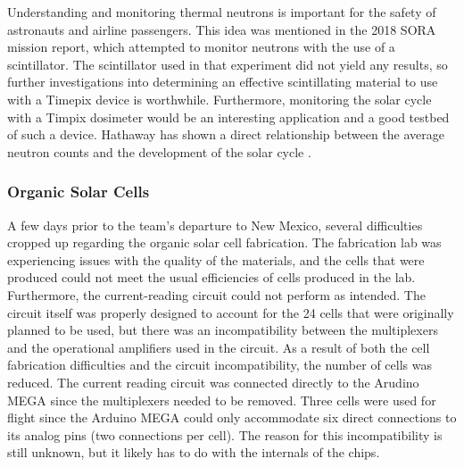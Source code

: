 Understanding and monitoring thermal neutrons is important for the safety of astronauts and airline passengers.
This idea was mentioned in the 2018 SORA mission report, which attempted to monitor neutrons with the use of a scintillator.
The scintillator used in that experiment did not yield any results, so further investigations into determining an effective scintillating material to use with a Timepix device is worthwhile.
Furthermore, monitoring the solar cycle with a Timpix dosimeter would be an interesting application and a good testbed of such a device.
Hathaway has shown a direct relationship between the average neutron counts and the development of the solar cycle \cite{Hathaway-Solar-Cycle}.



\subsubsection{Organic Solar Cells}

A few days prior to the team's departure to New Mexico, several difficulties cropped up regarding the organic solar cell fabrication.
The fabrication lab was experiencing issues with the quality of the materials, and the cells that were produced could not meet the usual efficiencies of cells produced in the lab.
Furthermore, the current-reading circuit could not perform as intended.
The circuit itself was properly designed to account for the 24 cells that were originally planned to be used, but there was an incompatibility between the multiplexers and the operational amplifiers used in the circuit.
As a result of both the cell fabrication difficulties and the circuit incompatibility, the number of cells was reduced.
The current reading circuit was connected directly to the Arudino MEGA since the multiplexers needed to be removed.
Three cells were used for flight since the Arduino MEGA could only accommodate six direct connections to its analog pins (two connections per cell).
The reason for this incompatibility is still unknown, but it likely has to do with the internals of the chips.
